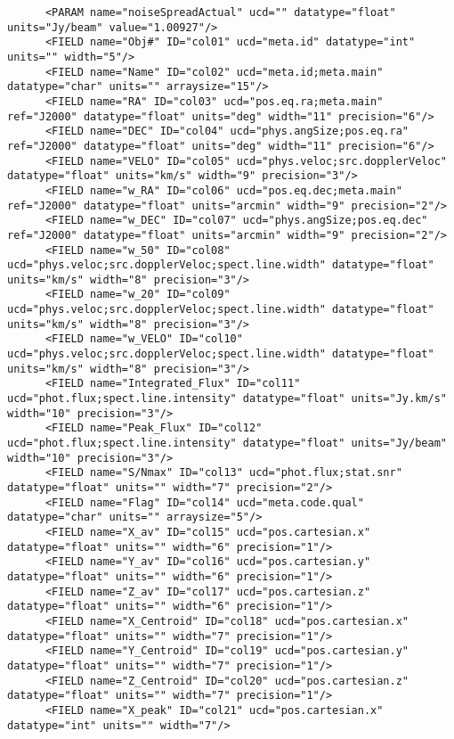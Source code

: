 {\begin{verbatim}
      <PARAM name="noiseSpreadActual" ucd="" datatype="float" units="Jy/beam" value="1.00927"/>
      <FIELD name="Obj#" ID="col01" ucd="meta.id" datatype="int" units="" width="5"/>
      <FIELD name="Name" ID="col02" ucd="meta.id;meta.main" datatype="char" units="" arraysize="15"/>
      <FIELD name="RA" ID="col03" ucd="pos.eq.ra;meta.main" ref="J2000" datatype="float" units="deg" width="11" precision="6"/>
      <FIELD name="DEC" ID="col04" ucd="phys.angSize;pos.eq.ra" ref="J2000" datatype="float" units="deg" width="11" precision="6"/>
      <FIELD name="VELO" ID="col05" ucd="phys.veloc;src.dopplerVeloc" datatype="float" units="km/s" width="9" precision="3"/>
      <FIELD name="w_RA" ID="col06" ucd="pos.eq.dec;meta.main" ref="J2000" datatype="float" units="arcmin" width="9" precision="2"/>
      <FIELD name="w_DEC" ID="col07" ucd="phys.angSize;pos.eq.dec" ref="J2000" datatype="float" units="arcmin" width="9" precision="2"/>
      <FIELD name="w_50" ID="col08" ucd="phys.veloc;src.dopplerVeloc;spect.line.width" datatype="float" units="km/s" width="8" precision="3"/>
      <FIELD name="w_20" ID="col09" ucd="phys.veloc;src.dopplerVeloc;spect.line.width" datatype="float" units="km/s" width="8" precision="3"/>
      <FIELD name="w_VELO" ID="col10" ucd="phys.veloc;src.dopplerVeloc;spect.line.width" datatype="float" units="km/s" width="8" precision="3"/>
      <FIELD name="Integrated_Flux" ID="col11" ucd="phot.flux;spect.line.intensity" datatype="float" units="Jy.km/s" width="10" precision="3"/>
      <FIELD name="Peak_Flux" ID="col12" ucd="phot.flux;spect.line.intensity" datatype="float" units="Jy/beam" width="10" precision="3"/>
      <FIELD name="S/Nmax" ID="col13" ucd="phot.flux;stat.snr" datatype="float" units="" width="7" precision="2"/>
      <FIELD name="Flag" ID="col14" ucd="meta.code.qual" datatype="char" units="" arraysize="5"/>
      <FIELD name="X_av" ID="col15" ucd="pos.cartesian.x" datatype="float" units="" width="6" precision="1"/>
      <FIELD name="Y_av" ID="col16" ucd="pos.cartesian.y" datatype="float" units="" width="6" precision="1"/>
      <FIELD name="Z_av" ID="col17" ucd="pos.cartesian.z" datatype="float" units="" width="6" precision="1"/>
      <FIELD name="X_Centroid" ID="col18" ucd="pos.cartesian.x" datatype="float" units="" width="7" precision="1"/>
      <FIELD name="Y_Centroid" ID="col19" ucd="pos.cartesian.y" datatype="float" units="" width="7" precision="1"/>
      <FIELD name="Z_Centroid" ID="col20" ucd="pos.cartesian.z" datatype="float" units="" width="7" precision="1"/>
      <FIELD name="X_peak" ID="col21" ucd="pos.cartesian.x" datatype="int" units="" width="7"/>

\end{verbatim}}
